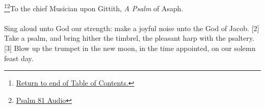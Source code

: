 \footnote{\textcolor[rgb]{0.00,0.25,0.00}{\hyperlink{PsalmsTOC}{Return to end of Table of Contents.}}}\footnote{\href{https://audiobible.com/bible/psalms_81.html}{\textcolor[cmyk]{0.99998,1,0,0}{Psalm 81 Audio}}}\textcolor[cmyk]{0.99998,1,0,0}{To the chief Musician upon Gittith, \emph{A Psalm} of Asaph.}\\
\\
\textcolor[cmyk]{0.99998,1,0,0}{Sing aloud unto God our strength: make a joyful noise unto the God of Jacob.} %
[2] \textcolor[cmyk]{0.99998,1,0,0}{Take a psalm, and bring hither the timbrel, the pleasant harp with the psaltery.}
[3] \textcolor[cmyk]{0.99998,1,0,0}{Blow up the trumpet in the new moon, in the time appointed, on our solemn feast day.} %
